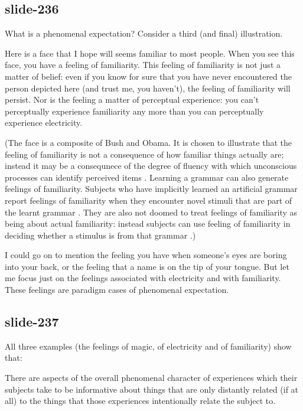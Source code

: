 \documentclass[12pt,\papersize]{extarticle}
\begin{document}
\subsection{slide-236}
What is a phenomenal expectation?  Consider a third (and final) illustration.

Here is a face that I hope will seems familiar to most people.
When you see this face, you have a feeling of familiarity.
This feeling of familiarity is not just a matter of belief:
even if you know for sure that you have never encountered the person
depicted here (and trust me, you haven’t), the feeling of familiarity
will persist.
Nor is the feeling a matter of perceptual experience: you can’t
perceptually experience familiarity
any more than you can perceptually experience electricity.

(The face is a composite of Bush and Obama.  It is chosen to illustrate that
the feeling of familiarity is not a consequence of how familiar things
actually are; instead it may be a consequnece of
the degree of fluency with which unconscious processes can identify
perceived items \citep{Whittlesea:1993xk,Whittlesea:1998qj}.
Learning a grammar can also generate feelings of familiarity.
Subjects who have implicitly learned an artificial grammar report feelings
of familiarity when they encounter novel stimuli that are part of
the learnt grammar \citep{scott:2008_familiarity}.
They are also not doomed to treat feelings of familiarity as being
about actual familiarity:
instead subjects can use feeling of
familiarity in deciding whether a stimulus is from that grammar
\citep{Wan:2008_familiarity}.)

I could go on to mention the feeling you have when someone’s eyes are
boring into your back, or the feeling that a name is on the tip of your
tongue.
But let me focus just on the feelings associated with electricity and
with familiarity.
These feelings are paradigm cases of phenomenal expectation.

\subsection{slide-237}
All three examples (the feelings of magic, of electricity and of
familiarity) show that:

There are aspects of the overall phenomenal character of experiences which their subjects take to be informative about things that are only distantly related (if at all) to the things that those experiences intentionally relate the subject to.
\end{document}
